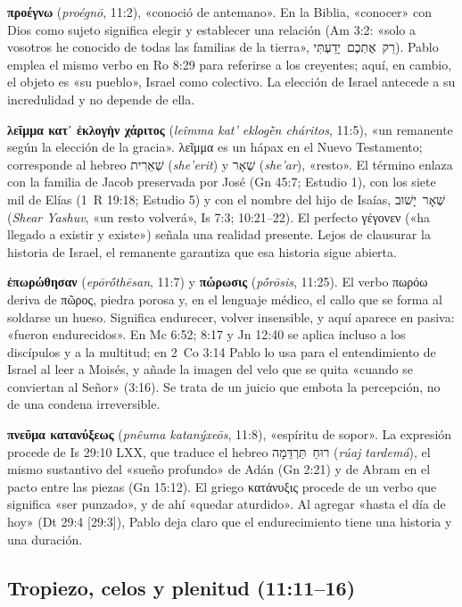 \documentclass[11pt,letterpaper]{article}
\newcommand{\heb}[1]{\mbox{\foreignlanguage{hebrew}{#1}}}
\newcommand{\grc}[1]{\foreignlanguage{ancientgreek}{#1}}
\begin{document}
\textbf{\grc{προέγνω}} (\emph{proégnō}, 11:2), «conoció de antemano». En la Biblia, «conocer» con Dios como sujeto significa elegir y establecer una relación (Am 3:2: «solo a vosotros he conocido de todas las familias de la tierra», \heb{רַק אֶתְכֶם יָדַעְתִּי}). Pablo emplea el mismo verbo en Ro 8:29 para referirse a los creyentes; aquí, en cambio, el objeto es «su pueblo», Israel como colectivo. La elección de Israel antecede a su incredulidad y no depende de ella.

\textbf{\grc{λεῖμμα κατ᾿ ἐκλογὴν χάριτος}} (\emph{leîmma kat' eklogḕn cháritos}, 11:5), «un remanente según la elección de la gracia». \grc{λεῖμμα} es un hápax en el Nuevo Testamento; corresponde al hebreo \heb{שְׁאֵרִית} (\emph{she'erit}) y \heb{שְׁאָר} (\emph{she'ar}), «resto». El término enlaza con la familia de Jacob preservada por José (Gn 45:7; Estudio 1), con los siete mil de Elías (1~R 19:18; Estudio 5) y con el nombre del hijo de Isaías, \heb{שְׁאָר יָשׁוּב} (\emph{Shear Yashuv}, «un resto volverá», Is 7:3; 10:21--22). El perfecto \grc{γέγονεν} («ha llegado a existir y existe») señala una realidad presente. Lejos de clausurar la historia de Israel, el remanente garantiza que esa historia sigue abierta.

\textbf{\grc{ἐπωρώθησαν}} (\emph{epōrṓthēsan}, 11:7) y \textbf{\grc{πώρωσις}} (\emph{pṓrōsis}, 11:25). El verbo \grc{πωρόω} deriva de \grc{πῶρος}, piedra porosa y, en el lenguaje médico, el callo que se forma al soldarse un hueso. Significa endurecer, volver insensible, y aquí aparece en pasiva: «fueron endurecidos». En Mc 6:52; 8:17 y Jn 12:40 se aplica incluso a los discípulos y a la multitud; en 2~Co 3:14 Pablo lo usa para el entendimiento de Israel al leer a Moisés, y añade la imagen del velo que se quita «cuando se conviertan al Señor» (3:16). Se trata de un juicio que embota la percepción, no de una condena irreversible.

\textbf{\grc{πνεῦμα κατανύξεως}} (\emph{pnêuma katanýxeōs}, 11:8), «espíritu de sopor». La expresión procede de Is 29:10 LXX, que traduce el hebreo \heb{רוּחַ תַּרְדֵּמָה} (\emph{rúaj tardemá}), el mismo sustantivo del «sueño profundo» de Adán (Gn 2:21) y de Abram en el pacto entre las piezas (Gn 15:12). El griego \grc{κατάνυξις} procede de un verbo que significa «ser punzado», y de ahí «quedar aturdido». Al agregar «hasta el día de hoy» (Dt 29:4 [29:3]), Pablo deja claro que el endurecimiento tiene una historia y una duración.

\subsection{Tropiezo, celos y plenitud (11:11--16)}
\end{document}
